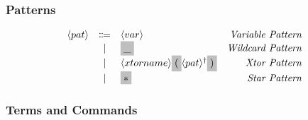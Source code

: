 \documentclass[11pt]{article}
\newcommand{\nonterminal}[1]{\langle #1 \rangle}
\newcommand{\terminal}[1]{\colorbox{lightgray}{\vphantom{X}#1}}
\newcommand{\commalist}[1]{#1^{\dagger}}
\begin{document}
\subsubsection{Patterns}
\[
  \begin{array}{lclr}
    \nonterminal{pat} & \Coloneqq & \nonterminal{var} & \emph{Variable Pattern} \\
    & | & \terminal{\_} & \emph{Wildcard Pattern} \\
    & | & \nonterminal{xtorname}\terminal{(}\commalist{\nonterminal{pat}} \terminal{)} & \emph{Xtor Pattern}\\
    & | & \terminal{$\ast$} & \emph{Star Pattern} \\
  \end{array}
\]

\subsubsection{Terms and Commands}
\end{document}
